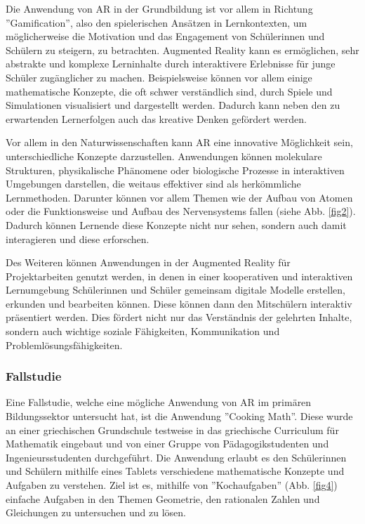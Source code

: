 \documentclass[conference]{IEEEtran}
\begin{document}
Die Anwendung von AR in der Grundbildung ist vor allem in Richtung ''Gamification'', 
also den spielerischen Ansätzen in Lernkontexten, um möglicherweise die Motivation und das Engagement von Schülerinnen
und Schülern zu steigern, zu betrachten. Augmented Reality kann es ermöglichen, sehr abstrakte und komplexe Lerninhalte durch interaktivere Erlebnisse für junge Schüler zugänglicher zu machen. Beispielsweise können vor allem einige mathematische Konzepte,
die oft schwer verständlich sind, durch Spiele und Simulationen visualisiert und dargestellt werden. Dadurch kann
neben den zu erwartenden Lernerfolgen auch das kreative Denken gefördert werden. \cite{b4}

Vor allem in den Naturwissenschaften kann AR eine innovative Möglichkeit sein, unterschiedliche Konzepte darzustellen.
Anwendungen können molekulare Strukturen, physikalische Phänomene oder biologische Prozesse in interaktiven Umgebungen darstellen, die weitaus effektiver sind als herkömmliche Lernmethoden. 
Darunter können vor allem Themen wie der Aufbau von Atomen oder die Funktionsweise und Aufbau des Nervensystems fallen (siehe Abb. \ref{fig2}). Dadurch können Lernende diese Konzepte nicht nur sehen,
sondern auch damit interagieren und diese erforschen. \cite{b6}

Des Weiteren können Anwendungen in der Augmented Reality für Projektarbeiten genutzt werden, in denen in einer kooperativen und interaktiven Lernumgebung Schülerinnen und Schüler gemeinsam digitale Modelle erstellen, erkunden und bearbeiten können.
Diese können dann den Mitschülern interaktiv präsentiert werden. Dies fördert nicht nur das Verständnis der gelehrten Inhalte,
sondern auch wichtige soziale Fähigkeiten, Kommunikation und Problemlösungsfähigkeiten.

\subsubsection*{Fallstudie}
Eine Fallstudie, welche eine mögliche Anwendung von AR im primären Bildungssektor untersucht hat, ist die Anwendung ''Cooking Math''.
Diese wurde an einer griechischen Grundschule testweise in das griechische Curriculum für Mathematik eingebaut und von einer Gruppe von Pädagogikstudenten und Ingenieursstudenten durchgeführt.
Die Anwendung erlaubt es den Schülerinnen und Schülern mithilfe eines Tablets verschiedene mathematische Konzepte und Aufgaben zu verstehen. Ziel ist es, mithilfe von ''Kochaufgaben'' (Abb. \ref{fig4}) einfache Aufgaben in den Themen Geometrie, den rationalen Zahlen und Gleichungen zu untersuchen und zu lösen.
\end{document}
